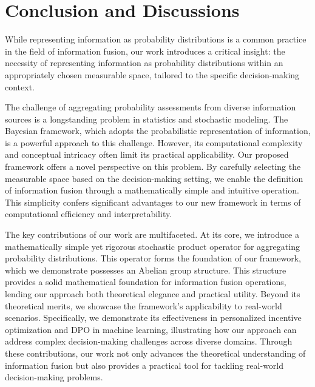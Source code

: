 \documentclass[letterpaper]{article} %
\theoremstyle{definition}
\theoremstyle{remark}
\begin{document}
\section{Conclusion and Discussions}


While representing information as probability distributions is a common practice in the field of information fusion, our work introduces a critical insight: the necessity of representing information as probability distributions within an appropriately chosen measurable space, tailored to the specific decision-making context. 

The challenge of aggregating probability assessments from diverse information sources is a longstanding problem in statistics and stochastic modeling. The Bayesian framework, which adopts the probabilistic representation of information, is a powerful approach to this challenge. However, its computational complexity and conceptual intricacy often limit its practical applicability. Our proposed framework offers a novel perspective on this problem. By carefully selecting the measurable space based on the decision-making setting, we enable the definition of information fusion through a mathematically simple and intuitive operation. This simplicity confers significant advantages to our new framework in terms of computational efficiency and interpretability. 


The key contributions of our work are multifaceted. At its core, we introduce a mathematically simple yet rigorous stochastic product operator for aggregating probability distributions. This operator forms the foundation of our framework, which we demonstrate possesses an Abelian group structure. This structure provides a solid mathematical foundation for information fusion operations, lending our approach both theoretical elegance and practical utility. Beyond its theoretical merits, we showcase the framework's applicability to real-world scenarios. Specifically, we demonstrate its effectiveness in personalized incentive optimization and DPO in machine learning, illustrating how our approach can address complex decision-making challenges across diverse domains. Through these contributions, our work not only advances the theoretical understanding of information fusion but also provides a practical tool for tackling real-world decision-making problems.
\end{document}

